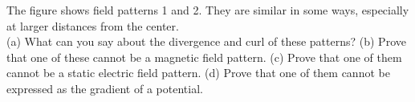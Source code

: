 The figure shows field patterns 1 and 2. They are similar in some ways, especially
at larger distances from the center.\\
(a) What can you say about the divergence and curl of these patterns?\hwendpart
(b) Prove that one of these cannot be a magnetic field pattern.\hwendpart
(c) Prove that one of them cannot be a static electric field pattern.\hwendpart
(d) Prove that one of them cannot be expressed as the gradient of a potential.
